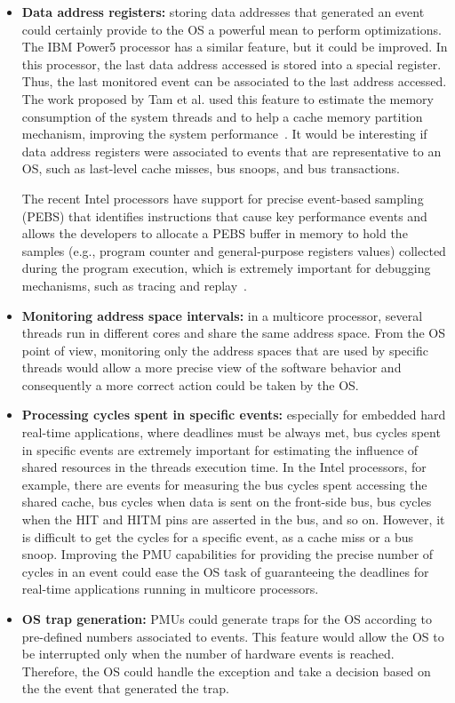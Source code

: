 \documentclass[conference]{IEEEtran}
\begin{document}
\begin{itemize}
	\item \textbf{Data address registers:} storing data addresses that generated an event could certainly provide to the OS a powerful mean to perform optimizations. The IBM Power5 processor has a similar feature, but it could be improved. In this processor, the last data address accessed is stored into a special register. Thus, the last monitored event can be associated to the last address accessed. The work proposed by Tam et al. used this feature to estimate the memory consumption of the system threads and to help a cache memory partition mechanism, improving the system performance~\cite{Tam:2009:ASPLOS}. It would be interesting if data address registers were associated to events that are representative to an OS, such as last-level cache misses, bus snoops, and bus transactions. 
	
	The recent Intel processors have support for precise event-based sampling (PEBS) that identifies instructions that cause key performance events and allows the developers to allocate a PEBS buffer in memory to hold the samples (e.g., program counter and general-purpose registers values) collected during the program execution, which is extremely important for debugging mechanisms, such as tracing and replay~\cite{Gracioli:2009}.
	
	\item \textbf{Monitoring address space intervals:} in a multicore processor, several threads run in different cores and share the same address space. From the OS point of view, monitoring only the address spaces that are used by specific threads would allow a more precise view of the software behavior and consequently a more correct action could be taken by the OS.
	
	\item \textbf{Processing cycles spent in specific events:} especially for embedded hard real-time applications, where deadlines must be always met, bus cycles spent in specific events are extremely important for estimating the influence of shared resources in the threads execution time. In the Intel processors, for example, there are events for measuring the bus cycles spent accessing the shared cache, bus cycles when data is sent on the front-side bus, bus cycles when the HIT and HITM pins are asserted in the bus, and so on. However, it is difficult to get the cycles for a specific event, as a cache miss or a bus snoop. Improving the PMU capabilities for providing the precise number of cycles in an event could ease the OS task of guaranteeing the deadlines for real-time applications running in multicore processors.
	
	\item \textbf{OS trap generation:} PMUs could generate traps for the OS according to pre-defined numbers associated to events. This feature would allow the OS to be interrupted only when the number of hardware events is reached. Therefore, the OS could handle the exception and take a decision based on the the event that generated the trap. 
\end{itemize}
\end{document}
